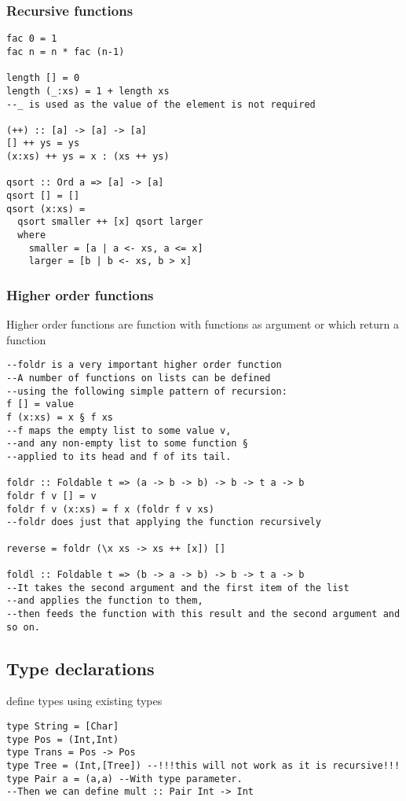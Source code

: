 \documentclass[12pt]{article}
\begin{document}
\subsubsection*{Recursive functions}
\begin{verbatim}
fac 0 = 1
fac n = n * fac (n-1)

length [] = 0
length (_:xs) = 1 + length xs 
--_ is used as the value of the element is not required

(++) :: [a] -> [a] -> [a]
[] ++ ys = ys
(x:xs) ++ ys = x : (xs ++ ys)

qsort :: Ord a => [a] -> [a]
qsort [] = []
qsort (x:xs) =
  qsort smaller ++ [x] qsort larger
  where
    smaller = [a | a <- xs, a <= x]
    larger = [b | b <- xs, b > x]
\end{verbatim}

\subsubsection*{Higher order functions}
Higher order functions are function with functions as argument or which return a function
\begin{verbatim}
--foldr is a very important higher order function
--A number of functions on lists can be defined 
--using the following simple pattern of recursion:
f [] = value
f (x:xs) = x § f xs
--f maps the empty list to some value v,
--and any non-empty list to some function §
--applied to its head and f of its tail.

foldr :: Foldable t => (a -> b -> b) -> b -> t a -> b
foldr f v [] = v
foldr f v (x:xs) = f x (foldr f v xs)  
--foldr does just that applying the function recursively

reverse = foldr (\x xs -> xs ++ [x]) []

foldl :: Foldable t => (b -> a -> b) -> b -> t a -> b
--It takes the second argument and the first item of the list 
--and applies the function to them, 
--then feeds the function with this result and the second argument and so on. 
\end{verbatim}




\subsection*{Type declarations}
define types using existing types
\begin{verbatim}
type String = [Char]
type Pos = (Int,Int)
type Trans = Pos -> Pos
type Tree = (Int,[Tree]) --!!!this will not work as it is recursive!!!
type Pair a = (a,a) --With type parameter. 
--Then we can define mult :: Pair Int -> Int
\end{verbatim}
\end{document}
